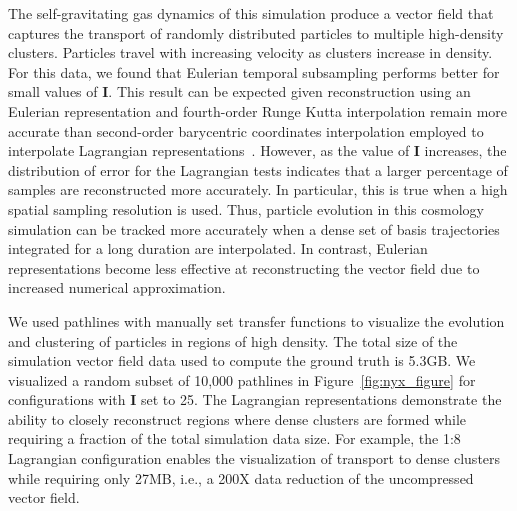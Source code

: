\documentclass[runningheads]{llncs}
\begin{document}
The self-gravitating gas dynamics of this simulation produce a vector field that captures the transport of randomly distributed particles to multiple high-density clusters.
%
Particles travel with increasing velocity as clusters increase in density.
%
For this data, we found that Eulerian temporal subsampling performs better for small values of \textbf{I}.
%
This result can be expected given reconstruction using an Eulerian representation and fourth-order Runge Kutta interpolation remain more accurate than second-order barycentric coordinates interpolation employed to interpolate Lagrangian representations~\cite{bujack2015lagrangian}\cite{hummel2016error}.
%
However, as the value of \textbf{I} increases, the distribution of error for the Lagrangian tests indicates that a larger percentage of samples are reconstructed more accurately.
%
In particular, this is true when a high spatial sampling resolution is used.
%
Thus, particle evolution in this cosmology simulation can be tracked more accurately when a dense set of basis trajectories integrated for a long duration are interpolated.
%
In contrast, Eulerian representations become less effective at reconstructing the vector field due to increased numerical approximation.
%

We used pathlines with manually set transfer functions to visualize the evolution and clustering of particles in regions of high density.
%
The total size of the simulation vector field data used to compute the ground truth is 5.3GB.
%
We visualized a random subset of 10,000 pathlines in Figure~\ref{fig:nyx_figure} for configurations with \textbf{I} set to 25.
%
The Lagrangian representations demonstrate the ability to closely reconstruct regions where dense clusters are formed while requiring a fraction of the total simulation data size.
%
For example, the 1:8 Lagrangian configuration enables the visualization of transport to dense clusters while requiring only 27MB, i.e., a 200X data reduction of the uncompressed vector field.
%

\vspace{-3mm}
\end{document}

